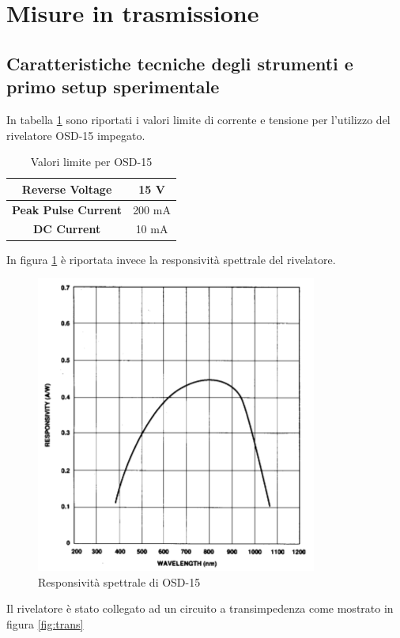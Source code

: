\documentclass[a4paper]{article}
\begin{document}
\section{Misure in trasmissione}

\subsection{Caratteristiche tecniche degli strumenti e primo setup sperimentale}

In tabella \ref{tab:osd} sono riportati i valori limite di corrente e tensione per l'utilizzo del rivelatore OSD-15 impegato.

\begin{table}[htp]
\centering
\caption{Valori limite per  OSD-15}
\label{tab:osd}
\begin{tabular}{c|c}
\textbf{Reverse Voltage} & 15 V \\ 
\hline 
\textbf{Peak Pulse Current} & 200 mA	 \\ 
\hline 
\textbf{DC Current} & 10 mA \\ 
\end{tabular} 
\end{table}

In figura \ref{fig:responsivity} è riportata invece la responsività spettrale del rivelatore.

\begin{figure}[htp]
\centering
\includegraphics[scale=.45]{responsivity}
\caption{Responsività spettrale di OSD-15}
\label{fig:responsivity}
\end{figure}

Il rivelatore è stato collegato ad un circuito a transimpedenza come mostrato in figura \ref{fig:trans}
\end{document}

